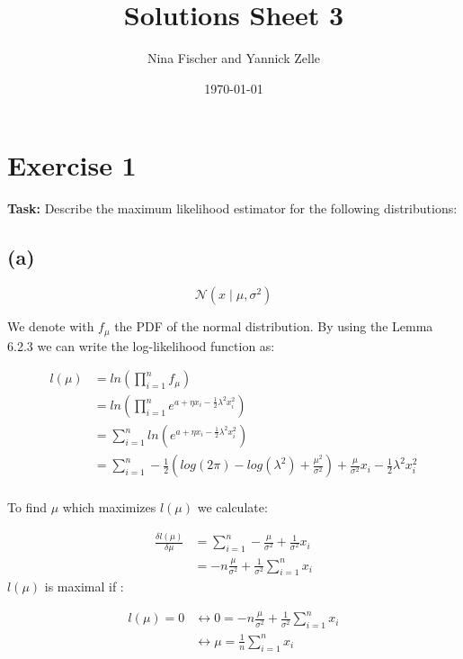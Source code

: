 \documentclass{article}
\title{Solutions Sheet 3}
\author{Nina Fischer and Yannick Zelle}
\date\today
\begin{document}
\maketitle %




\section*{Exercise 1}
 \textbf{Task:} Describe the maximum likelihood estimator for the following distributions:

 \subsection*{(a)}
 \[
 \mathcal{N}(x \mid \mu, \sigma^2)
 \]

 We denote with $f_\mu$ the PDF of the normal distribution. By using the Lemma 6.2.3 we can write the log-likelihood function as:

 \begin{align*}
     l(\mu) &= ln(\prod^n_{i=1} f_{\mu})\\
            &=ln(\prod^n_{i=1} e^{a+\eta x_i -\frac{1}{2}\lambda^2x_i^2})\\
            &= \sum^n_{i=1}ln(e^{a+\eta x_i -\frac{1}{2}\lambda^2x_i^2})\\
            &= \sum^n_{i=1} -\frac{1}{2}(log(2\pi)-log(\lambda^2)+\frac{\mu^2}{\sigma^2}) + \frac{\mu}{\sigma^2}x_i-\frac{1}{2}\lambda^2x_i^2\\
 \end{align*}

To find $\mu$ which maximizes $l(\mu)$ we calculate:

\begin{align*}
    \frac{\delta l(\mu)}{\delta \mu}    &= \sum_{i=1}^n -\frac{\mu}{\sigma^2} + \frac{1}{\sigma^2}x_i  \\
                                        &= -n\frac{\mu}{\sigma^2} + \frac{1}{\sigma^2} \sum_{i=1}^n x_i
\end{align*}
 $l(\mu)$ is maximal if :

 \begin{align*}
     l(\mu) = 0 & \leftrightarrow 0 = -n\frac{\mu}{\sigma^2} + \frac{1}{\sigma^2} \sum_{i=1}^n x_i\\
                & \leftrightarrow \mu =  \frac{1}{n} \sum_{i=1}^n x_i
    \end{align*}
\end{document}
